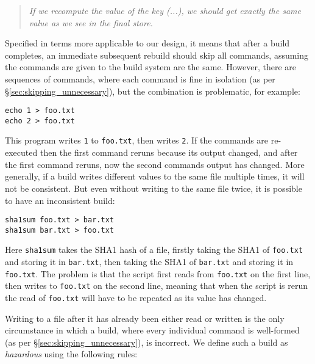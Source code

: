 \begin{quote}
\emph{If we recompute the value of the key (...), we should get exactly the same value as we see in the final store.}
\end{quote}

Specified in terms more applicable to our design, it means that after a build completes, an immediate subsequent rebuild should skip all commands, assuming the commands are given to the build system are the same. However, there are sequences of commands, where each command is fine in isolation (as per \S\ref{sec:skipping_unnecessary}), but the combination is problematic, for example:

\vspace{1mm}
\begin{verbatim}
echo 1 > foo.txt
echo 2 > foo.txt
\end{verbatim}
\vspace{1mm}

This program writes \texttt{1} to \texttt{foo.txt}, then writes \texttt{2}. If the commands are re-executed then the first command reruns because its output changed, and after the first command reruns, now the second commands output has changed. More generally, if a build writes different values to the same file multiple times, it will not be consistent. But even without writing to the same file twice, it is possible to have an inconsistent build:

\vspace{1mm}
\begin{verbatim}
sha1sum foo.txt > bar.txt
sha1sum bar.txt > foo.txt
\end{verbatim}
\vspace{1mm}

Here \texttt{sha1sum} takes the SHA1 hash of a file, firstly taking the SHA1 of \texttt{foo.txt} and storing it in \texttt{bar.txt}, then taking the SHA1 of \texttt{bar.txt} and storing it in \texttt{foo.txt}. The problem is that the script first reads from \texttt{foo.txt} on the first line, then writes to \texttt{foo.txt} on the second line, meaning that when the script is rerun the read of \texttt{foo.txt} will have to be repeated as its value has changed.

Writing to a file after it has already been either read or written is the only circumstance in which a build, where every individual command is well-formed (as per \S\ref{sec:skipping_unnecessary}), is incorrect. We define such a build as \emph{hazardous} using the following rules:

